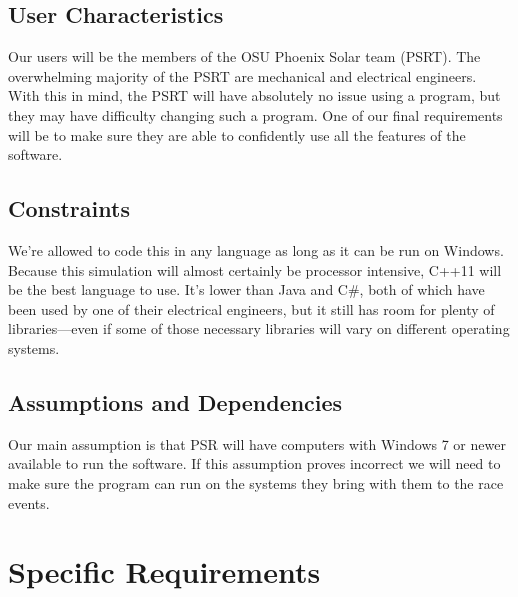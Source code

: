 \documentclass[onecolumn, draftclsnofoot,10pt, compsoc]{IEEEtran}
\begin{document}
    \subsection{User Characteristics}
    Our users will be the members of the OSU Phoenix Solar team (PSRT). The overwhelming majority of the PSRT are mechanical and electrical engineers.
    With this in mind, the PSRT will have absolutely no issue using a program, but they may have difficulty changing such a program. 
    One of our final requirements will be to make sure they are able to confidently use all the features of the software.
    
    \subsection{Constraints}
    We're allowed to code this in any language as long as it can be run on Windows. 
    Because this simulation will almost certainly be processor intensive, C++11 will be the best language to use.
    It's lower than Java and C\#, both of which have been used by one of their electrical engineers, but it still has room for plenty of libraries---even if some of those necessary libraries will vary on different operating systems.
    
    \subsection{Assumptions and Dependencies}
    Our main assumption is that PSR will have computers with Windows 7 or newer available to run the software. If this assumption proves incorrect we will need to make sure the program can run on the systems they bring with them to the race events.
    
\section{Specific Requirements}
\end{document}
